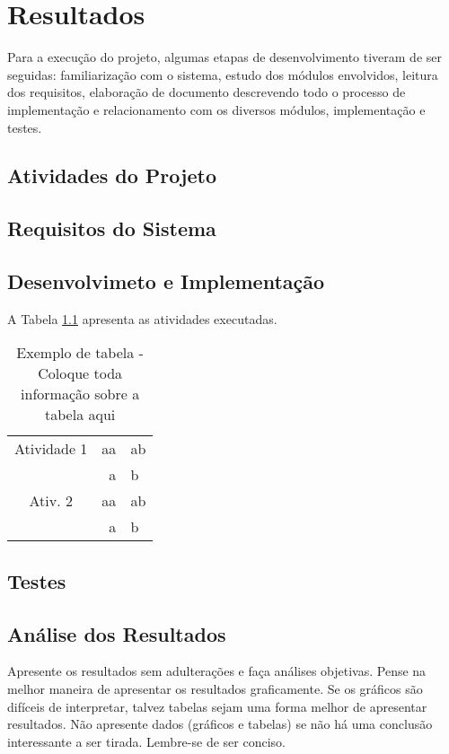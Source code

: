 \chapter{Resultados}

Para a execução do projeto, algumas etapas de desenvolvimento tiveram de ser seguidas: familiarização com o sistema, estudo dos módulos envolvidos, leitura dos requisitos, elaboração de documento descrevendo todo o processo de implementação e relacionamento com os diversos módulos, implementação e testes.


\section{Atividades do Projeto}
\label{metodo3}

\section {Requisitos do Sistema}
\label{req}


\section{Desenvolvimeto e Implementação}

A Tabela \ref{tab:tabela} apresenta as atividades executadas.

\begin{table}
\centering
\begin{tabular}{|c|r|l|}\hline
		Atividade 1 & aa  & ab  \\ 
					 & a & b \\ \hline
		Ativ. 2  & aa & ab \\			
					 &  a & b \\ \hline
		\end{tabular}
	\caption{Exemplo de tabela - Coloque toda informação sobre a tabela aqui}
	\label{tab:tabela}
\end{table}

\section{Testes}

\section{Análise dos Resultados}

Apresente os resultados sem adulterações e faça análises objetivas. Pense na melhor maneira de apresentar os resultados graficamente. Se os gráficos são difíceis de interpretar, talvez tabelas sejam uma forma melhor de apresentar resultados. Não apresente dados (gráficos e tabelas) se não há uma conclusão interessante a ser tirada. Lembre-se de ser conciso.

